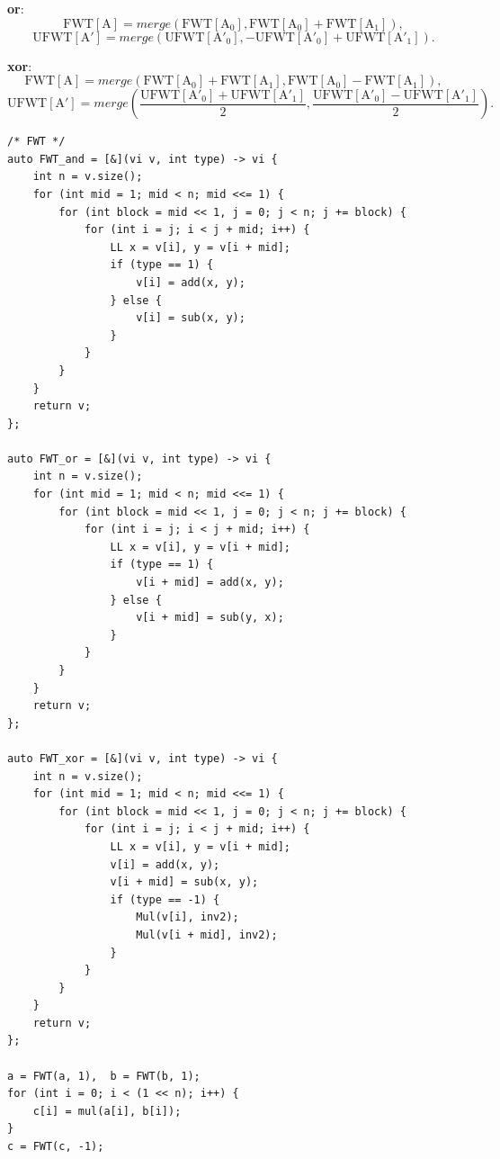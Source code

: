 \documentclass[UTF8, a4paper, titlepage, twoside]{ctexart}
\begin{document}
\textbf{or}:
\[
    \operatorname{FWT[A]} = merge(\operatorname{FWT[A_0]}, \operatorname{FWT[A_0]} + \operatorname{FWT[A_1]}),
\]
\[
    \operatorname{UFWT[A']} = merge(\operatorname{UFWT[A'_0]}, -\operatorname{UFWT[A'_0]} + \operatorname{UFWT[A'_1]}).
\]

\textbf{xor}:
\[
    \operatorname{FWT[A]} = merge(\operatorname{FWT[A_0]} + \operatorname{FWT[A_1]}, \operatorname{FWT[A_0]} - \operatorname{FWT[A_1]}),
\]
\[
    \operatorname{UFWT[A']} = merge\left(\frac{\operatorname{UFWT[A'_0]} + \operatorname{UFWT[A'_1]}}{2}, \frac{\operatorname{UFWT[A'_0]} - \operatorname{UFWT[A'_1]}}{2}\right).
\]

\begin{lstlisting}[style=cpp]
/* FWT */
auto FWT_and = [&](vi v, int type) -> vi {
    int n = v.size();
    for (int mid = 1; mid < n; mid <<= 1) {
        for (int block = mid << 1, j = 0; j < n; j += block) {
            for (int i = j; i < j + mid; i++) {
                LL x = v[i], y = v[i + mid];
                if (type == 1) {
                    v[i] = add(x, y);
                } else {
                    v[i] = sub(x, y);
                }
            }
        }
    }
    return v;
};

auto FWT_or = [&](vi v, int type) -> vi {
    int n = v.size();
    for (int mid = 1; mid < n; mid <<= 1) {
        for (int block = mid << 1, j = 0; j < n; j += block) {
            for (int i = j; i < j + mid; i++) {
                LL x = v[i], y = v[i + mid];
                if (type == 1) {
                    v[i + mid] = add(x, y);
                } else {
                    v[i + mid] = sub(y, x);
                }
            }
        }
    }
    return v;
};

auto FWT_xor = [&](vi v, int type) -> vi {
    int n = v.size();
    for (int mid = 1; mid < n; mid <<= 1) {
        for (int block = mid << 1, j = 0; j < n; j += block) {
            for (int i = j; i < j + mid; i++) {
                LL x = v[i], y = v[i + mid];
                v[i] = add(x, y);
                v[i + mid] = sub(x, y);
                if (type == -1) {
                    Mul(v[i], inv2);
                    Mul(v[i + mid], inv2);
                }
            }
        }
    }
    return v;
};

a = FWT(a, 1),  b = FWT(b, 1);
for (int i = 0; i < (1 << n); i++) {
    c[i] = mul(a[i], b[i]);
}
c = FWT(c, -1);
\end{lstlisting}
\end{document}
